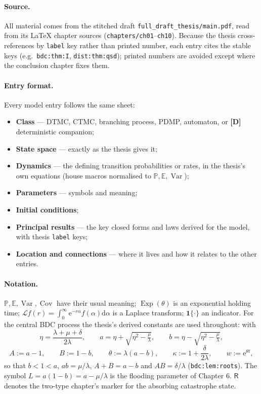 \documentclass[11pt,a4paper]{article}
\newcommand{\PR}{\mathbb{P}}
\newcommand{\EX}{\mathbb{E}}
\newcommand{\Var}{\operatorname{Var}}
\newcommand{\Cov}{\operatorname{Cov}}
\newcommand{\ee}{\mathrm{e}}
\newcommand{\dd}{\mathrm{d}}
\newcommand{\Ind}{\mathbf{1}}
\newcommand{\Lap}{\mathcal{L}}      %
\newcommand{\Rst}{\mathsf{R}}       %
\newcommand{\Exp}{\operatorname{Exp}}
\begin{document}
\paragraph{Source.} All material comes from the stitched draft
\texttt{full\_draft\_thesis/main.pdf}, read from its LaTeX chapter sources
(\texttt{chapters/ch01}--\texttt{ch10}). Because the thesis cross-references
by \texttt{label} key rather than printed number, each entry cites the
stable keys (e.g.\ \texttt{bdc:thm:I}, \texttt{dist:thm:qsd}); printed
numbers are avoided except where the conclusion chapter fixes them.

\paragraph{Entry format.} Every model entry follows the same sheet:
\begin{itemize}
  \item \textbf{Class} --- DTMC, CTMC, branching process, PDMP, automaton,
    or \textbf{[D]} deterministic companion;
  \item \textbf{State space} --- exactly as the thesis gives it;
  \item \textbf{Dynamics} --- the defining transition probabilities or
    rates, in the thesis's own equations (house macros normalised to
    $\PR,\EX,\Var$);
  \item \textbf{Parameters} --- symbols and meaning;
  \item \textbf{Initial conditions};
  \item \textbf{Principal results} --- the key closed forms and laws
    derived for the model, with thesis \texttt{label} keys;
  \item \textbf{Location and connections} --- where it lives and how it
    relates to the other entries.
\end{itemize}

\paragraph{Notation.} $\PR,\EX,\Var,\Cov$ have their usual meaning;
$\Exp(\theta)$ is an exponential holding time; $\Lap f(r)=\int_0^\infty
\ee^{-r\alpha}f(\alpha)\dd\alpha$ is a Laplace transform; $\Ind\{\cdot\}$ an
indicator. For the central BDC process the thesis's derived constants are
used throughout: with
\[
\eta=\frac{\lambda+\mu+\delta}{2\lambda},\qquad
a=\eta+\sqrt{\eta^{2}-\tfrac{\mu}{\lambda}},\qquad
b=\eta-\sqrt{\eta^{2}-\tfrac{\mu}{\lambda}},
\]
\[
A:=a-1,\qquad B:=1-b,\qquad \theta:=\lambda(a-b),\qquad
\kappa:=1+\frac{\delta}{2\lambda},\qquad w:=\ee^{\theta t},
\]
so that $b<1<a$, $ab=\mu/\lambda$, $A+B=a-b$ and $AB=\delta/\lambda$
(\texttt{bdc:lem:roots}). The symbol $L=a(1-b)=a-\mu/\lambda$ is the
flooding parameter of Chapter 6. $\Rst$ denotes the two-type chapter's
marker for the absorbing catastrophe state.
\end{document}
